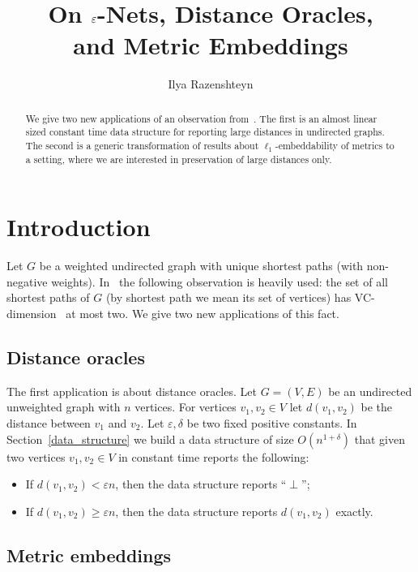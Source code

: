 \documentclass[12pt]{article}
\title{On $\eps$-Nets, Distance Oracles, \\ and Metric Embeddings}
\author{Ilya Razenshteyn}
\date{}
\newcommand{\eps}{\varepsilon}
\begin{document}
    \maketitle
    \begin{abstract}
        We give two new applications of an observation from~\cite{ADFGW11}.
        The first is an almost linear sized constant time data structure for reporting large distances in undirected graphs.
        The second is a generic transformation of results about $\ell_1$-embeddability of metrics to a setting,
        where we are interested in preservation of large distances only.
    \end{abstract}
    \section{Introduction}

    Let $G$ be a weighted undirected graph with unique shortest paths (with non-negative weights).
    In~\cite{ADFGW11} the following observation is heavily used: the set of all shortest paths of $G$ (by shortest path we mean its set of vertices)
    has VC-dimension~\cite{VC71} at most two.
    We give two new applications of this fact.

    \subsection{Distance oracles}

    The first application is about distance oracles.
    Let $G = (V, E)$ be an undirected unweighted graph with $n$ vertices.
    For vertices $v_1, v_2 \in V$ let $d(v_1, v_2)$ be the distance between $v_1$ and $v_2$.
    Let $\eps, \delta$ be two fixed positive constants.
    In Section~\ref{data_structure}
    we build a data structure of size $O(n^{1 + \delta})$ that given two vertices $v_1, v_2 \in V$ in constant time reports the following:
    \begin{itemize}
        \item If $d(v_1, v_2) < \eps n$, then the data structure reports ``$\perp$'';
        \item If $d(v_1, v_2) \geq \eps n$, then the data structure reports $d(v_1, v_2)$ exactly.
    \end{itemize}

    \subsection{Metric embeddings}
\end{document}

